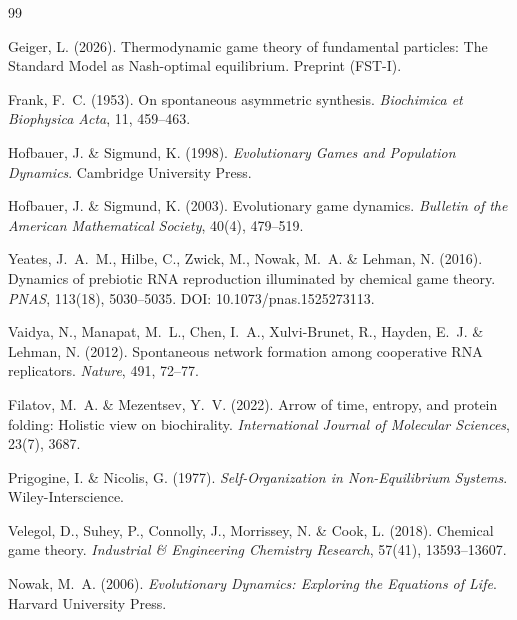 \documentclass[12pt,a4paper]{article}
\theoremstyle{remark}
\begin{document}

\begin{thebibliography}{99}

Geiger, L. (2026).
\newblock Thermodynamic game theory of fundamental particles: The Standard Model as Nash-optimal equilibrium.
\newblock Preprint (FST-I).

Frank, F.~C. (1953).
\newblock On spontaneous asymmetric synthesis.
\newblock \textit{Biochimica et Biophysica Acta}, 11, 459--463.

Hofbauer, J. \& Sigmund, K. (1998).
\newblock \textit{Evolutionary Games and Population Dynamics}.
\newblock Cambridge University Press.

Hofbauer, J. \& Sigmund, K. (2003).
\newblock Evolutionary game dynamics.
\newblock \textit{Bulletin of the American Mathematical Society}, 40(4), 479--519.

Yeates, J.~A.~M., Hilbe, C., Zwick, M., Nowak, M.~A. \& Lehman, N. (2016).
\newblock Dynamics of prebiotic RNA reproduction illuminated by chemical game theory.
\newblock \textit{PNAS}, 113(18), 5030--5035.
\newblock DOI: 10.1073/pnas.1525273113.

Vaidya, N., Manapat, M.~L., Chen, I.~A., Xulvi-Brunet, R., Hayden, E.~J. \& Lehman, N. (2012).
\newblock Spontaneous network formation among cooperative RNA replicators.
\newblock \textit{Nature}, 491, 72--77.

Filatov, M.~A. \& Mezentsev, Y.~V. (2022).
\newblock Arrow of time, entropy, and protein folding: Holistic view on biochirality.
\newblock \textit{International Journal of Molecular Sciences}, 23(7), 3687.

Prigogine, I. \& Nicolis, G. (1977).
\newblock \textit{Self-Organization in Non-Equilibrium Systems}.
\newblock Wiley-Interscience.

Velegol, D., Suhey, P., Connolly, J., Morrissey, N. \& Cook, L. (2018).
\newblock Chemical game theory.
\newblock \textit{Industrial \& Engineering Chemistry Research}, 57(41), 13593--13607.

Nowak, M.~A. (2006).
\newblock \textit{Evolutionary Dynamics: Exploring the Equations of Life}.
\newblock Harvard University Press.


\end{thebibliography}
\end{document}
